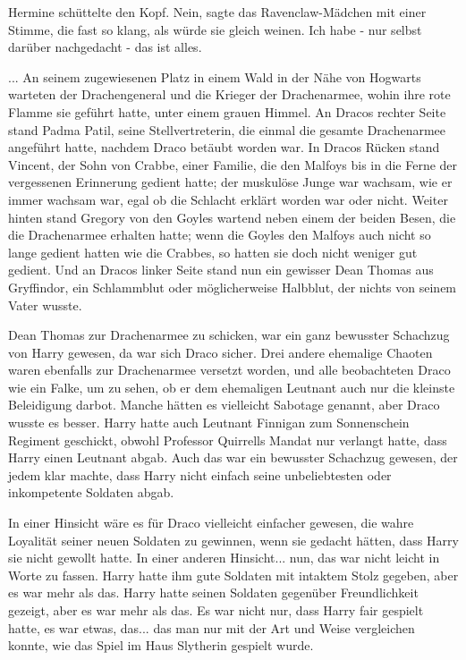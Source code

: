 Hermine schüttelte den Kopf. \glqq Nein\grqq{}, sagte das Ravenclaw-Mädchen mit
einer Stimme, die fast so klang, als würde sie gleich weinen. \glqq Ich habe -
nur selbst darüber nachgedacht - das ist alles.\grqq{}

... An seinem zugewiesenen Platz in einem Wald in der Nähe von Hogwarts warteten
der Drachengeneral und die Krieger der Drachenarmee, wohin ihre rote Flamme sie
geführt hatte, unter einem grauen Himmel. An Dracos rechter Seite stand Padma
Patil, seine Stellvertreterin, die einmal die gesamte Drachenarmee angeführt
hatte, nachdem Draco betäubt worden war. In Dracos Rücken stand Vincent, der
Sohn von Crabbe, einer Familie, die den Malfoys bis in die Ferne der vergessenen
Erinnerung gedient hatte; der muskulöse Junge war wachsam, wie er immer wachsam
war, egal ob die Schlacht erklärt worden war oder nicht. Weiter hinten stand
Gregory von den Goyles wartend neben einem der beiden Besen, die die
Drachenarmee erhalten hatte; wenn die Goyles den Malfoys auch nicht so lange
gedient hatten wie die Crabbes, so hatten sie doch nicht weniger gut gedient.
Und an Dracos linker Seite stand nun ein gewisser Dean Thomas aus Gryffindor,
ein Schlammblut oder möglicherweise Halbblut, der nichts von seinem Vater
wusste.

Dean Thomas zur Drachenarmee zu schicken, war ein ganz bewusster Schachzug von
Harry gewesen, da war sich Draco sicher. Drei andere ehemalige Chaoten waren
ebenfalls zur Drachenarmee versetzt worden, und alle beobachteten Draco wie ein
Falke, um zu sehen, ob er dem ehemaligen Leutnant auch nur die kleinste
Beleidigung darbot. Manche hätten es vielleicht Sabotage genannt, aber Draco
wusste es besser. Harry hatte auch Leutnant Finnigan zum Sonnenschein Regiment
geschickt, obwohl Professor Quirrells Mandat nur verlangt hatte, dass Harry
einen Leutnant abgab. Auch das war ein bewusster Schachzug gewesen, der jedem
klar machte, dass Harry nicht einfach seine unbeliebtesten oder inkompetente
Soldaten abgab.

In einer Hinsicht wäre es für Draco vielleicht einfacher gewesen, die wahre
Loyalität seiner neuen Soldaten zu gewinnen, wenn sie gedacht hätten, dass Harry
sie nicht gewollt hatte. In einer anderen Hinsicht... nun, das war nicht leicht
in Worte zu fassen. Harry hatte ihm gute Soldaten mit intaktem Stolz gegeben,
aber es war mehr als das. Harry hatte seinen Soldaten gegenüber Freundlichkeit
gezeigt, aber es war mehr als das. Es war nicht nur, dass Harry fair gespielt
hatte, es war etwas, das... das man nur mit der Art und Weise vergleichen
konnte, wie das Spiel im Haus Slytherin gespielt wurde.


